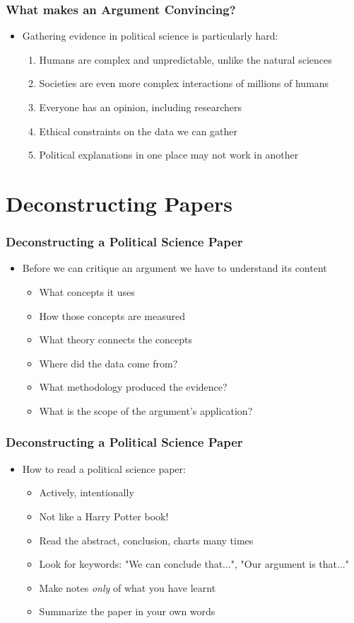 \documentclass[xcolor=x11names,compress]{beamer}\usepackage[]{graphicx}\usepackage[]{color}
\renewcommand{\(}{\begin{columns}}
\renewcommand{\)}{\end{columns}}
\newcommand{\<}[1]{\begin{column}{#1}}
\renewcommand{\>}{\end{column}}
\begin{document}
\begin{frame}
\frametitle{What makes an Argument Convincing?}
\begin{itemize}
\item Gathering evidence in political science is particularly hard:
\begin{enumerate}
\item Humans are complex and unpredictable, unlike the natural sciences
\item Societies are even more complex interactions of millions of humans
\item Everyone has an opinion, including researchers
\item Ethical constraints on the data we can gather
\item Political explanations in one place may not work in another
\end{enumerate}
\end{itemize}
\end{frame}

\section{Deconstructing Papers}

\begin{frame}
\frametitle{Deconstructing a Political Science Paper}
\begin{itemize}
\item Before we can critique an argument we have to understand its content
\begin{itemize}
\item What concepts it uses
\item How those concepts are measured
\item What theory connects the concepts
\item Where did the data come from?
\item What methodology produced the evidence?
\item What is the scope of the argument's application?
\end{itemize}
\end{itemize}
\end{frame}

\begin{frame}
\frametitle{Deconstructing a Political Science Paper}
\begin{itemize}
\item How to read a political science paper:
\begin{itemize}
\item Actively, intentionally
\item Not like a Harry Potter book!
\item Read the abstract, conclusion, charts many times
\item Look for keywords: "We can conclude that...", "Our argument is that..."
\item Make notes \textit{only} of what you have learnt
\item Summarize the paper in your own words
\end{itemize}
\end{itemize}
\end{frame}
\end{document}
